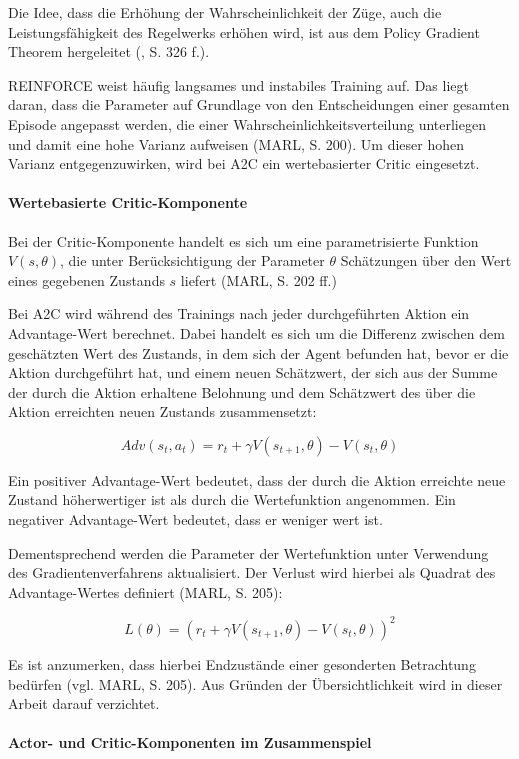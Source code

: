 Die Idee, dass die Erhöhung der Wahrscheinlichkeit der Züge, auch die Leistungsfähigkeit des Regelwerks erhöhen wird, ist aus dem Policy Gradient Theorem hergeleitet (\cite{Sutton.2018}, S. 326 f.).

REINFORCE weist häufig langsames und instabiles Training auf. Das liegt daran, dass die Parameter auf Grundlage von den Entscheidungen einer gesamten Episode angepasst werden, die einer Wahrscheinlichkeitsverteilung unterliegen und damit eine hohe Varianz aufweisen (MARL, S. 200). Um dieser hohen Varianz entgegenzuwirken, wird bei A2C ein wertebasierter Critic eingesetzt.

\paragraph{Wertebasierte Critic-Komponente}

Bei der Critic-Komponente handelt es sich um eine parametrisierte Funktion $V(s, \theta)$, die unter Berücksichtigung der Parameter $\theta$ Schätzungen über den Wert eines gegebenen Zustands $s$ liefert (MARL, S. 202 ff.)

Bei A2C wird während des Trainings nach jeder durchgeführten Aktion ein Advantage-Wert berechnet. Dabei handelt es sich um die Differenz zwischen dem geschätzten Wert des Zustands, in dem sich der Agent befunden hat, bevor er die Aktion durchgeführt hat, und einem neuen Schätzwert, der sich aus der Summe der durch die Aktion erhaltene Belohnung und dem Schätzwert des über die Aktion erreichten neuen Zustands zusammensetzt:

\[ Adv(s_t, a_t) = r_t + \gamma V(s_{t+1}, \theta) - V(s_t, \theta) \]

Ein positiver Advantage-Wert bedeutet, dass der durch die Aktion erreichte neue Zustand höherwertiger ist als durch die Wertefunktion angenommen. Ein negativer Advantage-Wert bedeutet, dass er weniger wert ist.

Dementsprechend werden die Parameter der Wertefunktion unter Verwendung des Gradientenverfahrens aktualisiert. Der Verlust wird hierbei als Quadrat des Advantage-Wertes definiert (MARL, S. 205):

\[ L(\theta) = (r_t + \gamma V(s_{t+1}, \theta) - V(s_t, \theta))^2 \]

Es ist anzumerken, dass hierbei Endzustände einer gesonderten Betrachtung bedürfen (vgl. MARL, S. 205). Aus Gründen der Übersichtlichkeit wird in dieser Arbeit darauf verzichtet.

\paragraph{Actor- und Critic-Komponenten im Zusammenspiel}

